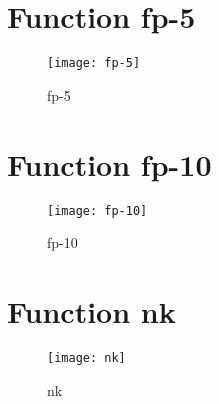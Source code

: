 \newpage

\section{Function fp-5}

\begin{center}

\end{center}

\begin{center}

\end{center}

\begin{figure}[h]
\begin{center}
\texttt{[image: fp-5]}
\caption{fp-5}
\end{center}
\end{figure}

\newpage

\section{Function fp-10}

\begin{center}

\end{center}

\begin{center}

\end{center}

\begin{figure}[h]
\begin{center}
\texttt{[image: fp-10]}
\caption{fp-10}
\end{center}
\end{figure}

\newpage

\section{Function nk}

\begin{center}

\end{center}

\begin{center}

\end{center}

\begin{figure}[h]
\begin{center}
\texttt{[image: nk]}
\caption{nk}
\end{center}
\end{figure}

